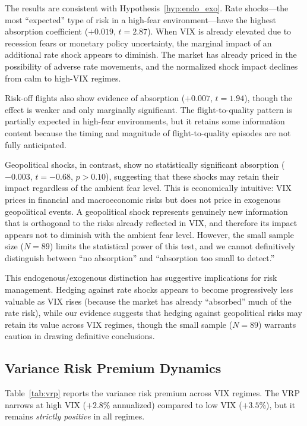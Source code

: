 \documentclass[12pt,a4paper]{article}
\begin{document}
The results are consistent with Hypothesis~\ref{hyp:endo_exo}. Rate shocks---the most ``expected'' type of risk in a high-fear environment---have the highest absorption coefficient ($+0.019$, $t = 2.87$). When VIX is already elevated due to recession fears or monetary policy uncertainty, the marginal impact of an additional rate shock appears to diminish. The market has already priced in the possibility of adverse rate movements, and the normalized shock impact declines from calm to high-VIX regimes.

Risk-off flights also show evidence of absorption ($+0.007$, $t = 1.94$), though the effect is weaker and only marginally significant. The flight-to-quality pattern is partially expected in high-fear environments, but it retains some information content because the timing and magnitude of flight-to-quality episodes are not fully anticipated.

Geopolitical shocks, in contrast, show no statistically significant absorption ($-0.003$, $t = -0.68$, $p > 0.10$), suggesting that these shocks may retain their impact regardless of the ambient fear level. This is economically intuitive: VIX prices in financial and macroeconomic risks but does not price in exogenous geopolitical events. A geopolitical shock represents genuinely new information that is orthogonal to the risks already reflected in VIX, and therefore its impact appears not to diminish with the ambient fear level. However, the small sample size ($N = 89$) limits the statistical power of this test, and we cannot definitively distinguish between ``no absorption'' and ``absorption too small to detect.''

This endogenous/exogenous distinction has suggestive implications for risk management. Hedging against rate shocks appears to become progressively less valuable as VIX rises (because the market has already ``absorbed'' much of the rate risk), while our evidence suggests that hedging against geopolitical risks may retain its value across VIX regimes, though the small sample ($N = 89$) warrants caution in drawing definitive conclusions.

\subsection{Variance Risk Premium Dynamics}
\label{sec:vrp}

Table~\ref{tab:vrp} reports the variance risk premium across VIX regimes. The VRP narrows at high VIX ($+2.8\%$ annualized) compared to low VIX ($+3.5\%$), but it remains \textit{strictly positive} in all regimes.
\end{document}
